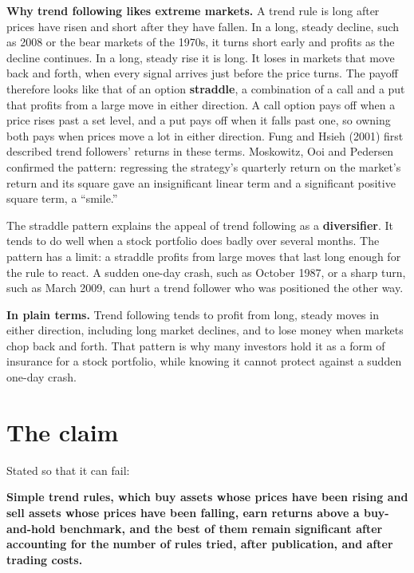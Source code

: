 \textbf{Why trend following likes extreme markets.} A trend rule is long after prices have risen and short after they have fallen. In a long, steady decline, such as 2008 or the bear markets of the 1970s, it turns short early and profits as the decline continues. In a long, steady rise it is long. It loses in markets that move back and forth, when every signal arrives just before the price turns. The payoff therefore looks like that of an option \textbf{straddle}, a combination of a call and a put that profits from a large move in either direction. A call option pays off when a price rises past a set level, and a put pays off when it falls past one, so owning both pays when prices move a lot in either direction. Fung and Hsieh (2001) first described trend followers' returns in these terms. Moskowitz, Ooi and Pedersen confirmed the pattern: regressing the strategy's quarterly return on the market's return and its square gave an insignificant linear term and a significant positive square term, a ``smile.''

The straddle pattern explains the appeal of trend following as a \textbf{diversifier}. It tends to do well when a stock portfolio does badly over several months. The pattern has a limit: a straddle profits from large moves that last long enough for the rule to react. A sudden one-day crash, such as October 1987, or a sharp turn, such as March 2009, can hurt a trend follower who was positioned the other way.

\noindent\textbf{In plain terms.} Trend following tends to profit from long, steady moves in either direction, including long market declines, and to lose money when markets chop back and forth. That pattern is why many investors hold it as a form of insurance for a stock portfolio, while knowing it cannot protect against a sudden one-day crash.

\section{The claim}
\label{sec:08-claim}

Stated so that it can fail:

\begin{callout}
\textbf{Simple trend rules, which buy assets whose prices have been rising and sell assets whose prices have been falling, earn returns above a buy-and-hold benchmark, and the best of them remain significant after accounting for the number of rules tried, after publication, and after trading costs.}
\end{callout}

